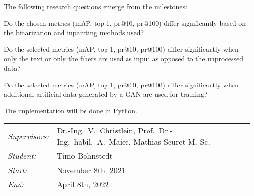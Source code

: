 \documentclass[12pt,a4paper]{article}
\begin{document}
The following research questions emerge from the milestones:

\begin{questions}
	\item Do the chosen metrics (mAP, top-1, pr@10, pr@100) differ significantly based on the binarization and inpainting methods used?
	
	\item  Do the selected metrics (mAP, top-1, pr@10, pr@100) differ significantly when only the text or only the fibers are used as input as opposed to the unprocessed data?  
	
	\item  Do the selected metrics (mAP, top-1, pr@10, pr@100) differ significantly when additional artificial data generated by a GAN are used for training?
\end{questions}

		
The implementation will be done in Python.\\
		
\begin{tabular}{ll}
	\emph{Supervisors:} & Dr.-Ing.~V.~Christlein,  Prof.~Dr.-Ing.~habil.~A.~Maier, Mathias Seuret M. Sc.
	\\
	\emph{Student:}     & Timo Bohnstedt
	\\
	\emph{Start:}       & November 8th, 2021                                            \\
	\emph{End:}         & April 8th, 2022                                        \\
\end{tabular}
\nopagebreak[4]
\small


		
\end{document}
